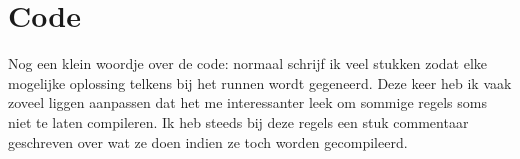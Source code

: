 \documentclass[10pt,a4paper,twocolumn]{article}
\begin{document}
\section{Code}
Nog een klein woordje over de code: normaal schrijf ik veel stukken zodat elke mogelijke oplossing telkens bij het runnen wordt gegeneerd. Deze keer heb ik vaak zoveel liggen aanpassen dat het me interessanter leek om sommige regels soms niet te laten compileren. Ik heb steeds bij deze regels een stuk commentaar geschreven over wat ze doen indien ze toch worden gecompileerd.
\end{document}
